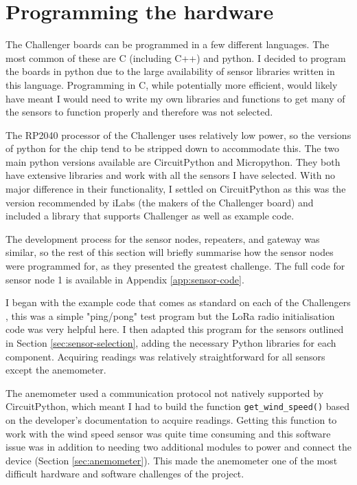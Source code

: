 \section{Programming the hardware}

The Challenger boards can be programmed in a few different languages. The most
common of these are C (including C++) and python. I decided to program the
boards in python due to the large availability of sensor libraries written in
this language. Programming in C, while potentially more efficient, would likely
have meant I would need to write my own libraries and functions to get many of
the sensors to function properly and therefore was not selected.

The RP2040 processor of the Challenger uses relatively low power, so the
versions of python for the chip tend to be stripped down to accommodate this.
The two main python versions available are CircuitPython and Micropython. They
both have extensive libraries and work with all the sensors I have selected.
With no major difference in their functionality, I settled on CircuitPython as
this was the version recommended by iLabs (the makers of the Challenger board)
and included a library that supports Challenger as well as example code.

The development process for the sensor nodes, repeaters, and gateway was
similar, so the rest of this section will briefly summarise how the sensor nodes
were programmed for, as they presented the greatest challenge. The full code for
sensor node 1 is available in Appendix \ref{app:sensor-code}.

I began with the example code that comes as standard on each of the Challengers
\cite{needell_challenger-rp2040_2025}, this was a simple "ping/pong" test
program but the LoRa radio initialisation code was very helpful here. I then
adapted this program for the sensors outlined in Section
\ref{sec:sensor-selection}, adding the necessary Python libraries for each
component. Acquiring readings was relatively straightforward for all sensors
except the anemometer.

The anemometer used a communication protocol not natively supported by
CircuitPython, which meant I had to build the function
\texttt{get\_wind\_speed()} based on the developer's documentation
\cite{dfrobotGuide}to acquire readings. Getting this function to work with the
wind speed sensor was quite time consuming and this software issue was in
addition to needing two additional modules to power and connect the device
(Section \ref{sec:anemometer}). This made the anemometer one of the most
difficult hardware and software challenges of the project.

